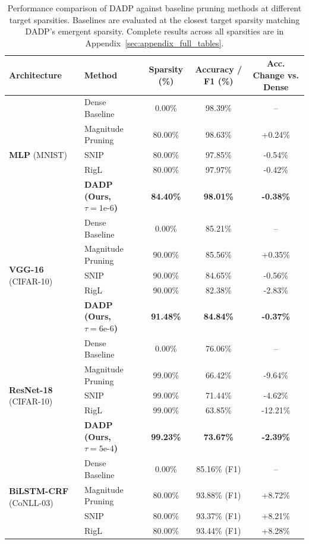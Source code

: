 \begin{table}[t]
\caption{Performance comparison of DADP against baseline pruning methods at different target sparsities. Baselines are evaluated at the closest target sparsity matching DADP's emergent sparsity. Complete results across all sparsities are in Appendix~\ref{sec:appendix_full_tables}.}
\label{tab:main_benchmarks}
\centering
\small
\begin{tabular}{llccc}
\toprule
\textbf{Architecture} & \textbf{Method} & \textbf{Sparsity (\%)} & \textbf{Accuracy / F1 (\%)} & \textbf{Acc. Change vs. Dense} \\
\midrule
\multirow{5}{*}{\textbf{MLP} (MNIST)} & Dense Baseline & 0.00\% & 98.39\% & -- \\
 & Magnitude Pruning & 80.00\% & 98.63\% & +0.24\% \\
 & SNIP & 80.00\% & 97.85\% & -0.54\% \\
 & RigL & 80.00\% & 97.97\% & -0.42\% \\
 & \textbf{DADP (Ours, $\tau = 1\text{e-}6$)} & \textbf{84.40\%} & \textbf{98.01\%} & \textbf{-0.38\%} \\
\midrule
\multirow{5}{*}{\textbf{VGG-16} (CIFAR-10)} & Dense Baseline & 0.00\% & 85.21\% & -- \\
 & Magnitude Pruning & 90.00\% & 85.56\% & +0.35\% \\
 & SNIP & 90.00\% & 84.65\% & -0.56\% \\
 & RigL & 90.00\% & 82.38\% & -2.83\% \\
 & \textbf{DADP (Ours, $\tau = 6\text{e-}6$)} & \textbf{91.48\%} & \textbf{84.84\%} & \textbf{-0.37\%} \\
\midrule
\multirow{5}{*}{\textbf{ResNet-18} (CIFAR-10)} & Dense Baseline & 0.00\% & 76.06\% & -- \\
 & Magnitude Pruning & 99.00\% & 66.42\% & -9.64\% \\
 & SNIP & 99.00\% & 71.44\% & -4.62\% \\
 & RigL & 99.00\% & 63.85\% & -12.21\% \\
 & \textbf{DADP (Ours, $\tau = 5\text{e-}4$)} & \textbf{99.23\%} & \textbf{73.67\%} & \textbf{-2.39\%} \\
\midrule
\multirow{5}{*}{\textbf{BiLSTM-CRF} (CoNLL-03)} & Dense Baseline & 0.00\% & 85.16\% (F1) & -- \\
 & Magnitude Pruning & 80.00\% & 93.88\% (F1) & +8.72\% \\
 & SNIP & 80.00\% & 93.37\% (F1) & +8.21\% \\
 & RigL & 80.00\% & 93.44\% (F1) & +8.28\% \\

\end{tabular}
\end{table}
